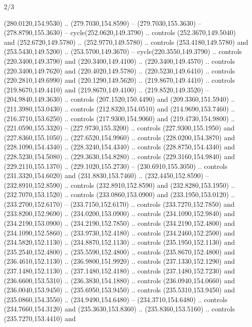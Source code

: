 \begin{flagdescription}{2/3}
\begin{scope}[xshift=0.5\flaglength,yshift=0.5\flagwidth,scale=\flagwidth/259.2]
\begin{scope}[y=0.8pt, x=0.8pt, yscale=-1,shift={(-243,-162)}]
      (280.0120,154.9530) .. (279.7030,154.8590) -- (279.7030,155.3630) --
      (278.8790,155.3630) -- cycle(252.0620,149.3790) .. controls
      (252.3670,149.5040) and (252.6720,149.5780) .. (252.9770,149.5780) .. controls
      (253.4180,149.5780) and (253.5430,149.5200) .. (253.5700,149.3670) --
      cycle(220.3550,149.3790) .. controls (220.3400,149.3790) and
      (220.3400,149.4100) .. (220.3400,149.4570) .. controls (220.3400,149.7620) and
      (220.4020,149.5780) .. (220.5230,149.6410) .. controls (220.2810,149.6990) and
      (220.1290,149.5620) .. (219.8670,149.4410) .. controls (219.8670,149.4410) and
      (219.8670,149.4100) .. (219.8520,149.3520) -- (204.9840,149.3630) .. controls
      (207.1520,150.4490) and (209.3360,151.5940) .. (211.3980,153.0430) .. controls
      (212.8320,154.0510) and (214.9690,153.7460) .. (216.3710,153.6250) .. controls
      (217.9300,154.9060) and (219.4730,154.9800) .. (221.0590,155.3320) --
      (227.9730,155.3200) .. controls (227.9300,155.1950) and (227.8360,155.1050) ..
      (227.6520,154.9960) .. controls (228.0200,154.3870) and (228.1090,154.4340) ..
      (228.3240,154.4340) .. controls (228.8750,154.4340) and (228.5230,154.5080) ..
      (229.3630,154.8280) .. controls (229.3160,154.9840) and (229.2110,155.1370) ..
      (229.1020,155.2730) -- (230.6910,155.3050) .. controls (231.3320,154.6020) and
      (231.8830,153.7460) .. (232.4450,152.8590) -- (232.8910,152.8590) .. controls
      (232.8910,152.8590) and (232.8280,153.1950) .. (232.7070,153.1520) .. controls
      (233.0860,153.0900) and (233.1950,153.0120) .. (233.2700,152.6170) --
      (233.7150,152.6170) .. controls (233.7270,152.7850) and (233.8200,152.9690) ..
      (234.0200,153.0900) .. controls (234.1090,152.9840) and (234.2190,153.0900) ..
      (234.2190,152.7850) .. controls (234.2190,152.4800) and (234.1090,152.5860) ..
      (233.9730,152.4180) .. controls (234.2460,152.2500) and (234.5820,152.1130) ..
      (234.8870,152.1130) .. controls (235.1950,152.1130) and (235.2540,152.4800) ..
      (235.5590,152.4800) .. controls (235.8670,152.4800) and (236.4610,152.1130) ..
      (236.9800,151.9920) .. controls (237.1330,152.1290) and (237.1480,152.1130) ..
      (237.1480,152.4180) .. controls (237.1480,152.7230) and (236.6600,153.5310) ..
      (236.3830,154.1880) .. controls (236.0940,154.0660) and (236.0040,153.9450) ..
      (235.6950,153.9450) .. controls (235.5310,153.9450) and (235.0860,154.3550) ..
      (234.9490,154.6480) -- (234.3710,154.6480) .. controls (234.7660,154.3120) and
      (235.3630,153.8360) .. (235.8360,153.5160) .. controls (235.7270,153.4410) and

\end{scope}
\end{scope}
\end{flagdescription}
